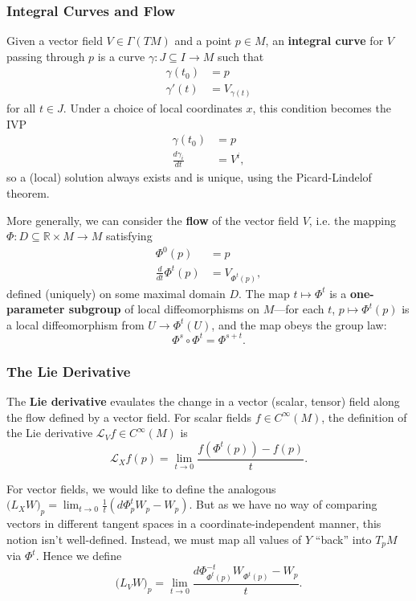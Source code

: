 \documentclass[reqno]{amsart}
\numberwithin{equation}{section}
\begin{document}
\subsubsection{Integral Curves and Flow}

Given a vector field $V \in \Gamma(TM)$ and a point $p \in M$, an \textbf{integral curve} for $V$ passing through $p$
is a curve $\gamma : J \subseteq I \to M$ such that
\begin{align*}
    \gamma(t_0) &= p \\
    \gamma'(t) &= V_{\gamma(t)}
\end{align*}
for all $t \in J$. Under a choice of local coordinates $x$, this condition becomes the IVP
\begin{align*}
    \gamma(t_0) &= p \\
    \frac{d \gamma_i}{dt} &= V^i,
\end{align*}
so a (local) solution always exists and is unique,
using the Picard-Lindelof theorem.

More generally, we can consider the \textbf{flow} of the vector field $V$, i.e. the mapping
$\Phi : D \subseteq \mathbb R \times M \to M$ satisfying
\begin{align*}
    \Phi^0(p) &= p \\
    \frac{d}{dt} \Phi^t(p) &= V_{\Phi^t(p)},
\end{align*}
defined (uniquely) on some maximal domain $D$. The map $t \mapsto \Phi^t$ is a
\textbf{one-parameter subgroup} of local diffeomorphisms on $M$---for each $t$, $p \mapsto \Phi^t(p)$
is a local diffeomorphism from $U \to \Phi^t(U)$, and the map obeys the group law:
$$
    \Phi^s \circ \Phi^t = \Phi^{s+t}.
$$

\subsubsection{The Lie Derivative}

The \textbf{Lie derivative} evaulates the change in a vector (scalar, tensor) field along the flow defined
by a vector field. For scalar fields $f \in C^{\infty}(M)$, the definition of the Lie derivative $\mathcal L_Vf \in
C^{\infty}(M)$ is
$$
\mathcal L_X f(p) = \lim_{t \to 0} \frac{f(\Phi^t(p)) - f(p)}{t}.
$$

For vector fields, we would like to define the analogous
$\mathcal (L_X W)_p = \lim_{t \to 0} \frac{1}{t}(d\Phi^t_p W_p - W_p)$. But as we have no way of comparing vectors
in different tangent spaces in a coordinate-independent manner, this notion isn't well-defined. Instead, we must
map all values of $Y$ ``back'' into $T_pM$ via $\Phi^t$. Hence we define
$$
    \mathcal (L_V W)_p = \lim_{t \to 0} \frac{d\Phi^{-t}_{\Phi^t(p)}W_{\Phi^t(p)} - W_p}{t}.
$$
\end{document}
